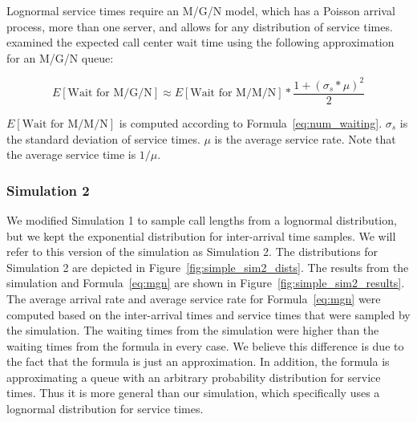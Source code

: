 Lognormal service times require an M/G/N model, which has a Poisson arrival
process, more than one server, and allows for any distribution of service times.
\citet{queue1} examined the expected call center wait time using the
following approximation for an M/G/N queue:

\begin{equation}
  E[\text{Wait for M/G/N}] \approx E[\text{Wait for M/M/N}] *
  \frac{1 + (\sigma_s * \mu)^2}{2}
\label{eq:mgn}
\end{equation}

$E[\text{Wait for M/M/N}]$ is computed according to
Formula~\ref{eq:num_waiting}.
$\sigma_s$ is the standard deviation of service times.
$\mu$ is the average service rate.
Note that the average service time is $1/\mu$.

\subsubsection{Simulation 2}

We modified Simulation 1 to sample call lengths from a lognormal
distribution, but we kept the exponential distribution for inter-arrival time
samples.
We will refer to this version of the simulation as Simulation 2.
The distributions for Simulation 2 are depicted in
Figure~\ref{fig:simple_sim2_dists}.
The results from the simulation and Formula~\ref{eq:mgn} are shown in
Figure~\ref{fig:simple_sim2_results}.
The average arrival rate and average service rate for Formula~\ref{eq:mgn} were
computed based on the inter-arrival times and service times that were sampled by
the simulation.
The waiting times from the simulation were higher than the waiting times from
the formula in every case.
We believe this difference is due to the fact that the formula is just an
approximation.
In addition, the formula is approximating a queue with an arbitrary probability
distribution for service times.
Thus it is more general than our simulation, which specifically uses a lognormal
distribution for service times.

